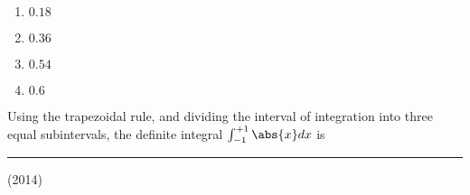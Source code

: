 \begin{multicols}{2}
\begin{enumerate}
\item $0.18$
\item $0.36$
\item $0.54$
\item $0.6$
\end{enumerate}
\end{multicols}


\item Using the trapezoidal rule, and dividing the interval of integration into three equal subintervals, the definite integral $\int_{-1}^{+1}\abs{x}dx$ is \rule{1cm}{0.15mm}\hfill(2014)